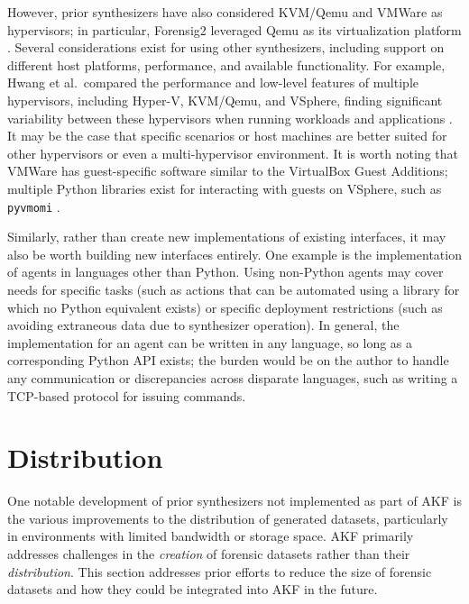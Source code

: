 \documentclass[letterpaper,12pt]{report}
\newcommand{\passthrough}[1]{#1}
\begin{document}
However, prior synthesizers have also considered KVM/Qemu and VMWare as
hypervisors; in particular, Forensig2 leveraged Qemu as its
virtualization platform \cite{mochForensicImageGenerator2009}.
Several considerations exist for using other synthesizers, including
support on different host platforms, performance, and available
functionality. For example, Hwang et al.~compared the performance and
low-level features of multiple hypervisors, including Hyper-V, KVM/Qemu,
and VSphere, finding significant variability between these hypervisors
when running workloads and applications
\cite{hwangComponentbasedPerformanceComparison2013}. It may be the
case that specific scenarios or host machines are better suited for
other hypervisors or even a multi-hypervisor environment. It is worth
noting that VMWare has guest-specific software similar to the VirtualBox
Guest Additions; multiple Python libraries exist for interacting with
guests on VSphere, such as \passthrough{\lstinline!pyvmomi!}
\cite{VmwarePyvmomi2025}.

Similarly, rather than create new implementations of existing
interfaces, it may also be worth building new interfaces entirely. One
example is the implementation of agents in languages other than Python.
Using non-Python agents may cover needs for specific tasks (such as
actions that can be automated using a library for which no Python
equivalent exists) or specific deployment restrictions (such as avoiding
extraneous data due to synthesizer operation). In general, the
implementation for an agent can be written in any language, so long as a
corresponding Python API exists; the burden would be on the author to
handle any communication or discrepancies across disparate languages,
such as writing a TCP-based protocol for issuing commands.

\section{Distribution}\label{distribution}

One notable development of prior synthesizers not implemented as part of
AKF is the various improvements to the distribution of generated
datasets, particularly in environments with limited bandwidth or storage
space. AKF primarily addresses challenges in the \emph{creation} of
forensic datasets rather than their \emph{distribution}. This section
addresses prior efforts to reduce the size of forensic datasets and how
they could be integrated into AKF in the future.
\end{document}
